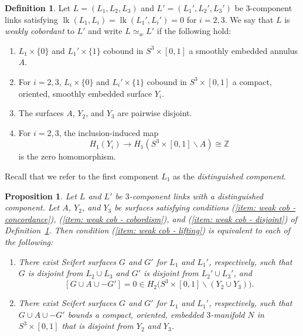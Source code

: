 \documentclass[a4paper, 11pt]{amsart}
\newtheorem{proposition}[theorem]{Proposition}
\theoremstyle{definition}
\newtheorem{definition}[theorem]{Definition}
\newcommand{\Z}{\mathbb{Z}}
\newcommand{\lk}{\operatorname{lk}}
\newcommand{\pref}[1]{(\ref{#1})}
\begin{document}
\begin{definition}\label{defn:weak cob}
Let $L=(L_1, L_2, L_3)$ and $L'=(L_1', L_2', L_3')$ be $3$-component links satisfying $\lk(L_1,L_i)=\lk(L_1',L_i')=0$ for $i=2,3$. We say that $L$ is \emph{weakly cobordant} to $L'$ and write $L\simeq_w L'$ if the following hold:
\begin{enumerate}
\item \label{item: weak cob - concordance} $L_1\times\{0\}$ and $L_1'\times\{1\}$ cobound in $S^3\times[0,1]$ a smoothly embedded annulus $A$.
\item \label{item: weak cob - cobordism} For $i=2,3$, $L_i\times\{0\}$ and $L_i'\times \{1\}$ cobound in $S^3\times[0,1]$ a compact, oriented, smoothly embedded surface $Y_i$.
\item \label{item: weak cob - disjoint} The surfaces $A$, $Y_2$, and $Y_3$ are pairwise disjoint.
\item \label{item: weak cob - lifting} For $i=2,3$, the inclusion-induced map
\[
H_1(Y_i)\to H_1(S^3\times[0,1]\smallsetminus A)\cong \Z
\]
is the zero homomorphism.
\end{enumerate}
\end{definition}

Recall that we refer to the first component $L_1$ as the \emph{distinguished component}.


\begin{proposition}\label{prop: equiv to weak cobordism}
Let $L$ and $L'$ be $3$-component links with a distinguished component. Let $A$, $Y_2$, and $Y_3$ be surfaces satisfying conditions \pref{item: weak cob - concordance}, \pref{item: weak cob - cobordism}, and \pref{item: weak cob - disjoint} of Definition~\ref{defn:weak cob}. Then condition \pref{item: weak cob - lifting} is equivalent to each of the following:
\begin{enumerate}[label=(\Alph*)]
\item \label{item weak cob lifting A}
There exist Seifert surfaces $G$ and $G'$ for $L_1$ and $L_1'$, respectively, such that $G$ is disjoint from $L_2\cup L_3$ and $G'$ is disjoint from $L_2'\cup L_3'$, and
\[
[G\cup A\cup -G']=0 \in H_2\bigl(S^3\times[0,1]\smallsetminus (Y_2\cup Y_3)\bigr).
\]
\item \label{item weak cob lifting B}
There exist Seifert surfaces $G$ and $G'$ for $L_1$ and $L_1'$, respectively, such that $G\cup A\cup -G'$ bounds a compact, oriented, embedded $3$-manifold $N$ in $S^3\times[0,1]$ that is disjoint from $Y_2$ and $Y_3$.
\end{enumerate}
\end{proposition}
\end{document}
